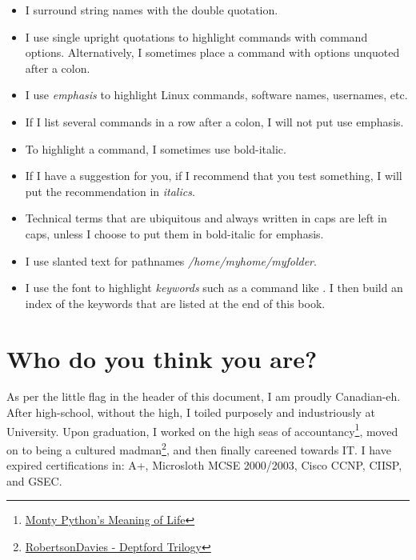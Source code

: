 \begin{itemize}
	\item {} I surround string names with the double quotation.
	\item {} I use single upright quotations to highlight commands with command options. Alternatively, I sometimes place a command with options unquoted after a colon.
	\item {}  I use \emph{emphasis} to highlight Linux commands, software names, usernames, etc.
	\item {} If I list several commands in a row after a colon, I will not put use emphasis.
	\item {} To highlight a command, I sometimes use bold-italic.
	\item {} If I have a suggestion for you, if I recommend that you test something, I will put the recommendation in \textit{italics}.
	\item {} Technical terms that are ubiquitous and always written in caps are left in caps, unless I choose to put them in bold-italic for emphasis.
	\item {} I use slanted text for pathnames \textsl{/home/myhome/myfolder}.
	\item {} I use the \latex {} font to highlight \emph{keywords} such as a command like . I then build an index of the keywords that are listed at the end of this book.
\end{itemize}

\section{Who do you think you are?}

As per the little flag in the header of this document, I am proudly Canadian-eh. After high-school, without the high, I toiled purposely and industriously at University. Upon graduation, I worked on the high seas of accountancy\footnote{\href{https://www.youtube.com/watch?v=7YUiBBltOg4}{Monty Python's Meaning of Life}}, moved on to being a cultured madman\footnote{\href{http://www.penguin.com/static/html/classics/readingguides/deptfordtrilogy.php}{RobertsonDavies - Deptford Trilogy}}, and then finally careened towards IT. I have expired certifications in: A+, Microsloth MCSE 2000/2003, Cisco CCNP, CIISP, and GSEC.

